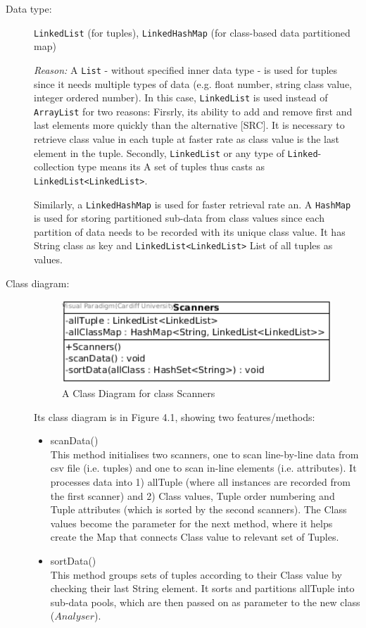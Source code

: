 \begin{description}
\item[Data type: ] \texttt{LinkedList} (for tuples), \texttt{LinkedHashMap} (for class-based data partitioned map)

\textit{Reason: } A \texttt{List} - without specified inner data type - is used for tuples since it needs multiple types of data (e.g. float number, string class value, integer ordered number). In this case, \texttt{LinkedList} is used instead of \texttt{ArrayList} for two reasons: Firsrly, its ability to add and remove first and last elements more quickly than the alternative [SRC]. It is necessary to retrieve class value in each tuple at faster rate as class value is the last element in the tuple. Secondly, \texttt{LinkedList} or any type of \texttt{Linked}-collection type means its  A set of tuples thus casts as \texttt{LinkedList<LinkedList>}.

Similarly, a \texttt{LinkedHashMap} is used for faster retrieval rate an. A \texttt{HashMap} is used for storing partitioned sub-data from class values since each partition of data needs to be recorded with its unique class value. It has String class as key and \texttt{LinkedList<LinkedList>} List of all tuples as values. 

\item[Class diagram: ] 

\begin{figure}[h]
    \centering
    \includegraphics[width=5in]{figures/class_scanners}
    \caption[Class Diagram for class Scanners]{A Class Diagram for class Scanners}
    \label{fig:figure4_2}
\end{figure}

Its class diagram is in Figure 4.1, showing two features/methods:
\begin{itemize}
	\item{scanData()} \\
	This method initialises two scanners, one to scan line-by-line data from csv file (i.e. tuples) and one to scan in-line elements (i.e. attributes).
	It processes data into 1) allTuple (where all instances are recorded from the first scanner) and 2) Class values, Tuple order numbering and Tuple attributes (which is sorted by the second scanners).
	The Class values become the parameter for the next method, where it helps create the Map that connects Class value to relevant set of Tuples.
	\item{sortData()} \\
	This method groups sets of tuples according to their Class value by checking their last String element. It sorts and partitions allTuple into sub-data pools, which are then passed on as parameter to the new class ($Analyser$).
	

\end{itemize}
\end{description}

